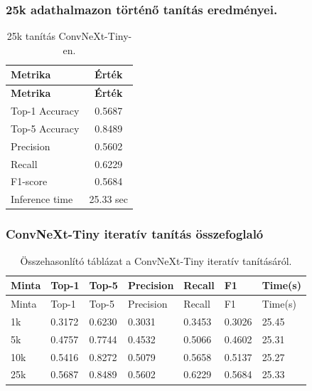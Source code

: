     \subsubsection{25k adathalmazon történő tanítás eredményei.}
      \begin{center}
        \begin{longtable}{l c}
        \caption{25k tanítás ConvNeXt-Tiny-en.} \label{tab:phase03_ConvNeXt-Tiny_25k} \\
        \toprule
        \textbf{Metrika} & \textbf{Érték} \\
        \midrule
        \endfirsthead
        \toprule
        \textbf{Metrika} & \textbf{Érték} \\
        \midrule
        \endhead
        Top-1 Accuracy & 0.5687 \\
        Top-5 Accuracy & 0.8489 \\
        Precision      & 0.5602 \\
        Recall         & 0.6229 \\
        F1-score       & 0.5684 \\
        Inference time & 25.33 sec \\
        \bottomrule
        \end{longtable}
      \end{center}

      \subsubsection{ConvNeXt-Tiny iteratív tanítás összefoglaló}
      \begin{center}
        \begin{longtable}{lllllll}
        \caption{Összehasonlító táblázat a ConvNeXt-Tiny iteratív tanításáról.}\label{tab:phase3_ConvNeXt-Tiny_summary_table}\\
        \toprule
        Minta & Top-1 & Top-5 & Precision & Recall & F1 & Time(s) \\
        \midrule
        \endfirsthead
        \toprule
        Minta & Top-1 & Top-5 & Precision & Recall & F1 & Time(s) \\
        \midrule
        \endhead
        1k & 0.3172 & 0.6230 & 0.3031 & 0.3453 & 0.3026 & 25.45 \\
        5k & 0.4757 & 0.7744 & 0.4532 & 0.5066 & 0.4602 & 25.31 \\
        10k & 0.5416 & 0.8272 & 0.5079 & 0.5658 & 0.5137 & 25.27 \\
        25k & 0.5687 & 0.8489 & 0.5602 & 0.6229 & 0.5684 & 25.33 \\
        \bottomrule
        \end{longtable}
      \end{center}
      
